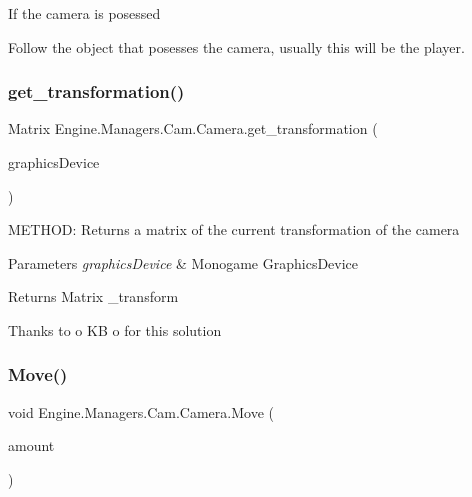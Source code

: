 If the camera is posessed

Follow the object that posesses the camera, usually this will be the player. \mbox{\label{a00490_af3d0a20954c676fc8d14467fa6a3ed9f}} 
\subsubsection{\texorpdfstring{get\+\_\+transformation()}{get\_transformation()}}
{\footnotesize\ttfamily Matrix Engine.\+Managers.\+Cam.\+Camera.\+get\+\_\+transformation (\begin{DoxyParamCaption}\item[{Graphics\+Device}]{graphics\+Device }\end{DoxyParamCaption})\hspace{0.3cm}{\ttfamily [inline]}}



M\+E\+T\+H\+OD\+: Returns a matrix of the current transformation of the camera 


\begin{DoxyParams}{Parameters}
{\em graphics\+Device} & Monogame Graphics\+Device\\
\hline
\end{DoxyParams}
\begin{DoxyReturn}{Returns}
Matrix \+\_\+transform
\end{DoxyReturn}
Thanks to o KB o for this solution \mbox{\label{a00490_aed786ac2b98679e90e3cc3fe5189f84e}} 
\subsubsection{\texorpdfstring{Move()}{Move()}}
{\footnotesize\ttfamily void Engine.\+Managers.\+Cam.\+Camera.\+Move (\begin{DoxyParamCaption}\item[{Vector2}]{amount }\end{DoxyParamCaption})\hspace{0.3cm}{\ttfamily [inline]}}



